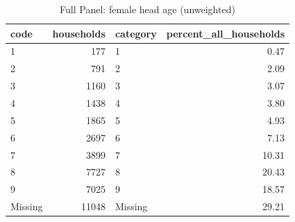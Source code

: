 \begin{table}
\caption{Full Panel: female head age (unweighted)}
\begin{tabular}{lrlr}
\toprule
code & households & category & percent\_all\_households \\
\midrule
1 & 177 & 1 & 0.47 \\
2 & 791 & 2 & 2.09 \\
3 & 1160 & 3 & 3.07 \\
4 & 1438 & 4 & 3.80 \\
5 & 1865 & 5 & 4.93 \\
6 & 2697 & 6 & 7.13 \\
7 & 3899 & 7 & 10.31 \\
8 & 7727 & 8 & 20.43 \\
9 & 7025 & 9 & 18.57 \\
Missing & 11048 & Missing & 29.21 \\
\bottomrule
\end{tabular}
\end{table}
